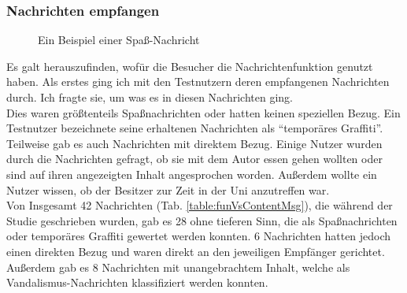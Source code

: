 \subsubsection{Nachrichten empfangen}\label{Nachrichten Empfangen}
\begin{figure}[h!]
  \centering
  \caption{Ein Beispiel einer Spaß-Nachricht}
  \label{img:StudieExampleMessage}
\end{figure}
Es galt herauszufinden, wofür die Besucher die Nachrichtenfunktion genutzt haben.
Als erstes ging ich mit den Testnutzern deren empfangenen Nachrichten durch.
Ich fragte sie, um was es in diesen Nachrichten ging.
\\
Dies waren größtenteils Spaßnachrichten  oder hatten keinen speziellen Bezug. Ein Testnutzer bezeichnete seine erhaltenen Nachrichten als ``temporäres Graffiti''.
Teilweise gab es auch Nachrichten mit direktem Bezug.
Einige Nutzer wurden durch die Nachrichten gefragt, ob sie mit dem Autor essen gehen wollten oder sind auf ihren angezeigten Inhalt angesprochen worden.
Außerdem wollte ein Nutzer wissen, ob der Besitzer zur Zeit in der Uni anzutreffen war.
\\
Von Insgesamt 42 Nachrichten (Tab. \ref{table:funVsContentMsg}), die während der Studie geschrieben wurden, gab es 28 ohne tieferen Sinn, die als Spaßnachrichten oder temporäres Graffiti gewertet werden konnten. 6 Nachrichten hatten jedoch einen direkten Bezug und waren direkt an den jeweiligen Empfänger gerichtet. Außerdem gab es 8 Nachrichten mit unangebrachtem Inhalt, welche als Vandalismus-Nachrichten klassifiziert werden konnten.
\\
